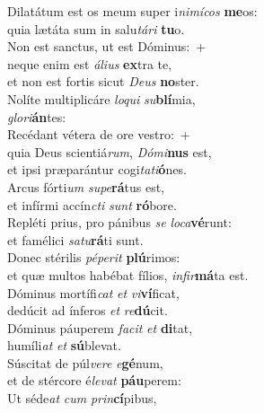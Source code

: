 \evenverse Dilatátum est os meum super i\textit{ni}\textit{mí}\textit{cos} \textbf{me}os:~\*\\
\evenverse quia lætáta sum in salu\textit{tá}\textit{ri} \textbf{tu}o.\\
\oddverse Non est sanctus, ut est Dóminus:~+\\
\oddverse  neque enim est \textit{á}\textit{li}\textit{us} \textbf{ex}tra te,~\*\\
\oddverse et non est fortis sicut \textit{De}\textit{us} \textbf{no}ster.\\
\evenverse Nolíte multiplicáre \textit{lo}\textit{qui} \textit{su}\textbf{blí}mia,~\*\\
\evenverse \textit{glo}\textit{ri}\textbf{án}tes:\\
\oddverse Recédant vétera de ore vestro:~+\\
\oddverse  quia Deus scientiá\textit{rum}, \textit{Dó}\textit{mi}\textbf{nus} est,~\*\\
\oddverse et ipsi præparántur cogi\textit{ta}\textit{ti}\textbf{ó}nes.\\
\evenverse Arcus fórti\textit{um} \textit{su}\textit{pe}\textbf{rá}tus est,~\*\\
\evenverse et infírmi accín\textit{cti} \textit{sunt} \textbf{ró}bore.\\
\oddverse Repléti prius, pro pánibus \textit{se} \textit{lo}\textit{ca}\textbf{vé}runt:~\*\\
\oddverse et famélici \textit{sa}\textit{tu}\textbf{rá}ti sunt.\\
\evenverse Donec stérilis \textit{pé}\textit{pe}\textit{rit} \textbf{plú}rimos:~\*\\
\evenverse et quæ multos habébat fílios, \textit{in}\textit{fir}\textbf{má}ta est.\\
\oddverse Dóminus mortífi\textit{cat} \textit{et} \textit{vi}\textbf{ví}ficat,~\*\\
\oddverse dedúcit ad ínferos \textit{et} \textit{re}\textbf{dú}cit.\\
\evenverse Dóminus páuperem \textit{fa}\textit{cit} \textit{et} \textbf{di}tat,~\*\\
\evenverse humíli\textit{at} \textit{et} \textbf{sú}blevat.\\
\oddverse Súscitat de púl\textit{ve}\textit{re} \textit{e}\textbf{gé}num,~\*\\
\oddverse et de stércore é\textit{le}\textit{vat} \textbf{páu}perem:\\
\evenverse Ut séde\textit{at} \textit{cum} \textit{prin}\textbf{cí}pibus,~\*\\

